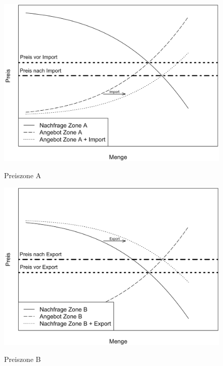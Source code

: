 \begin{figure}[htbp]
    \centering
    \begin{minipage}{0.49\textwidth}
        \centering
        \href{https://www.tandfonline.com/doi/abs/10.1080/14697688.2020.1733059}{\includegraphics[width=\linewidth]{Graphs/Abbildung2.png}}
        \caption{Preiszone A}    
        \label{fig:Abbildung2}
    \end{minipage}
    \hfill
    \begin{minipage}{0.49\textwidth}
        \centering
        \href{https://www.tandfonline.com/doi/abs/10.1080/14697688.2020.1733059}{\includegraphics[width=\linewidth]{Graphs/Abbildung3.png}}
        \caption{Preiszone B}        
        \label{fig:Abbildung3}
    \end{minipage}
\end{figure}


